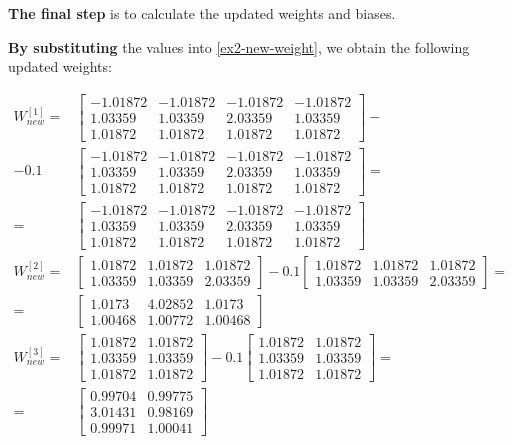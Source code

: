 \documentclass[12pt]{article}
\begin{document}
\begin{enumerate}[leftmargin=\labelsep]
          \textbf{The final step} is to calculate the updated weights and biases.

          \textbf{By substituting} the values into \eqref{ex2-new-weight}, we obtain the following updated weights:

          \vskip -0.2cm
          \begin{align*}
              W^{[1]}_{new} = & \begin{bmatrix} -1.01872 & -1.01872 & -1.01872 & -1.01872 \\ 1.03359 & 1.03359 & 2.03359 & 1.03359 \\ 1.01872 & 1.01872 & 1.01872 & 1.01872 \end{bmatrix} -\\
                - 0.1 & \begin{bmatrix} -1.01872 & -1.01872 & -1.01872 & -1.01872 \\ 1.03359 & 1.03359 & 2.03359 & 1.03359 \\ 1.01872 & 1.01872 & 1.01872 & 1.01872 \end{bmatrix} = \\
                = & \begin{bmatrix} -1.01872 & -1.01872 & -1.01872 & -1.01872 \\ 1.03359 & 1.03359 & 2.03359 & 1.03359 \\ 1.01872 & 1.01872 & 1.01872 & 1.01872 \end{bmatrix} \\
              W^{[2]}_{new} = & \begin{bmatrix} 1.01872 & 1.01872 & 1.01872 \\ 1.03359 & 1.03359 & 2.03359 \end{bmatrix} -
                0.1 \begin{bmatrix} 1.01872 & 1.01872 & 1.01872 \\ 1.03359 & 1.03359 & 2.03359 \end{bmatrix} = \\
                = & \begin{bmatrix} 1.0173 & 4.02852 & 1.0173 \\ 1.00468 & 1.00772 & 1.00468\end{bmatrix} \\
              W^{[3]}_{new} = & \begin{bmatrix} 1.01872 & 1.01872 \\ 1.03359 & 1.03359 \\ 1.01872 & 1.01872 \end{bmatrix} -
                0.1 \begin{bmatrix} 1.01872 & 1.01872 \\ 1.03359 & 1.03359 \\ 1.01872 & 1.01872 \end{bmatrix} = \\
                = & \begin{bmatrix} 0.99704 & 0.99775 \\ 3.01431 & 0.98169 \\ 0.99971 & 1.00041\end{bmatrix}
          \end{align*}


\end{enumerate}
\end{document}

